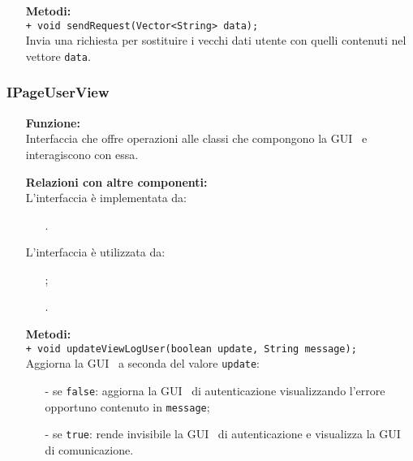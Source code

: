 {\begin{sloppypar}
{{\begin{itemize}
			\item[] \textbf{Metodi:}\\
				\texttt{+ void sendRequest(Vector<String> data);}\\
				Invia una richiesta per sostituire i vecchi dati utente con quelli contenuti nel vettore \texttt{data}.\\
		\end{itemize}		
		}
		
		
		\subsubsection{IPageUserView}\label{ssub:IPageUserView}{
		\begin{itemize}
			\item[] \textbf{Funzione:} \\
			Interfaccia che offre operazioni alle classi che compongono la GUI\g~ e interagiscono con essa.\\
			
			\item[] \textbf{Relazioni con altre componenti:} \\
			L'interfaccia è implementata da:
			\begin{itemize}
				\item[] .
			\end{itemize}
			L'interfaccia è utilizzata da:
			\begin{itemize}
				\item[] ;
				\item[] .\\
			\end{itemize}
			
			\item[]  \textbf{Metodi:}\\
			\texttt{+ void updateViewLogUser(boolean update, String message);}\\
			Aggiorna la GUI\g~ a seconda del valore \texttt{update}:
			\begin{itemize}
				\item[-] se \texttt{false}: aggiorna la GUI\g~ di autenticazione visualizzando l'errore opportuno contenuto in \texttt{message};
				\item[-] se \texttt{true}: rende invisibile la GUI\g~ di autenticazione e visualizza la GUI\g~ di comunicazione.\\
			\end{itemize}
			

\end{itemize}}}
\end{sloppypar}}
